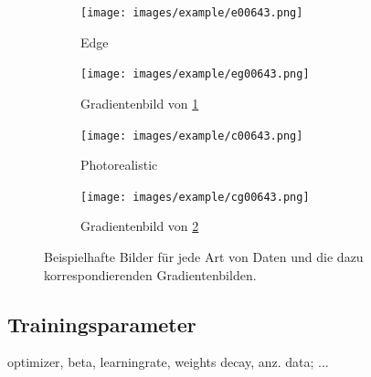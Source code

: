 \begin{figure}[htp]
	\hfill
	\begin{subfigure}[b]{0.48\linewidth}
		\centering
		\texttt{[image: images/example/e00643.png]}
		\caption{Edge}
		\label{subfig:edge}
	\end{subfigure}
	\hfill
	\begin{subfigure}[b]{0.48\linewidth}
		\centering
		\texttt{[image: images/example/eg00643.png]}
		\caption{Gradientenbild von \ref{subfig:edge}}
	\end{subfigure}
	\hfill
	\begin{subfigure}[b]{0.48\linewidth}
		\centering
		\texttt{[image: images/example/c00643.png]}
		\caption{Photorealistic}
		\label{subfig:photorealistic}
	\end{subfigure}
	\hfill
	\begin{subfigure}[b]{0.48\linewidth}
		\centering
		\texttt{[image: images/example/cg00643.png]}
		\caption{Gradientenbild von \ref{subfig:photorealistic}}
	\end{subfigure}
	\caption{Beispielhafte Bilder für jede Art von Daten und die dazu korrespondierenden Gradientenbilden.}
	\label{fig:dataset_preprocess}
\end{figure}
\vspace{\fill}

\subsection{Trainingsparameter}
optimizer, beta,
learningrate,
weights decay, anz. data; ...